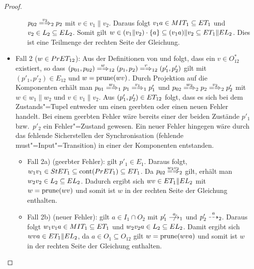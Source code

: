 \begin{proof}
\begin{itemize}
\begin{itemize}
        $p_{02}\weakmay[v_2]_2 p_2$ mit $v\in v_1\|v_2$. Daraus folgt $v_1a\in
        MIT _1 \subseteq ET _1$ und $v_2\in L_2\subseteq EL _2$. Somit gilt
        $w\in (v_1\|v_2) \cdot \{a\} \subseteq (v_1a)\|v_2\subseteq ET _1\|EL
        _2$. Dies ist eine Teilmenge der rechten Seite der Gleichung.
    \end{itemize}
  \item Fall 2 ($w\in PrET _{12}$): Aus der Definitionen von \PrET{} und
      \prune{} folgt, dass ein $v\in O_{12}^*$ existiert, so dass
      $(p_{01},p_{02}) \weakmay[w]_{12} (p_1,p_2) \weakmay[v]_{12} (p'_1,p'_2)$
      gilt mit $(p'_1,p'_2)\in E_{12}$ und $w=\mathrm{prune} (wv)$. Durch Projektion
      auf die Komponenten erhält man $p_{01} \weakmay[w_1]_1 p_1
      \weakmay[v_1]_1 p'_1$ und $p_{02} \weakmay[w_2]_2 p_2 \weakmay[v_2]_2
      p'_2$ mit $w\in w_1\|w_2$ und $v\in v_1\|v_2$. Aus $(p'_1,p'_2)\in ET
      _{12}$ folgt, dass es sich bei dem Zustands"=Tupel entweder um einen
      geerbten oder einen neuen Fehler handelt. Bei einem geerbten Fehler wäre
      bereits einer der beiden Zustände $p'_1$ bzw.\ $p'_2$ ein Fehler"=Zustand
      gewesen. Ein neuer Fehler hingegen wäre durch das fehlende Sicherstellen
      der Synchronisation (fehlende must"=Input"=Transition) in einer der
      Komponenten entstanden.
    \begin{itemize}
      \item Fall 2a) (geerbter Fehler): \OBdA{} gilt $p'_1\in E_1$. Daraus
        folgt, $w_1v_1\in StET_1 \subseteq \mathrm{cont} (PrET _1) \subseteq ET _1$.
        Da $p_{02} \weakmay[w_2v_2]_2$ gilt, erhält man $w_2v_2\in L_2\subseteq
        EL _2$. Dadurch ergibt sich $wv\in ET _1\|EL _2$ mit $w=\mathrm{prune} (wv)$
        und somit ist $w$ in der rechten Seite der Gleichung enthalten.
      \item Fall 2b) (neuer Fehler): \OBdA{} gilt $a\in I_1\cap O_2$ mit
        $p'_1\nmust[a]_1$ und $p'_2\may[a]_2$. Daraus folgt $w_1v_1a\in MIT _1
        \subseteq ET _1$ und $w_2v_2a\in L_2 \subseteq EL _2$. Damit ergibt
        sich $wva\in ET _1\|EL_2$, da $a\in O_1\subseteq O_{12}$ gilt
        $w=\mathrm{prune} (wva)$ und somit ist $w$ in der rechten Seite der Gleichung
        enthalten.
    \end{itemize}
  \end{itemize}


\end{proof}
